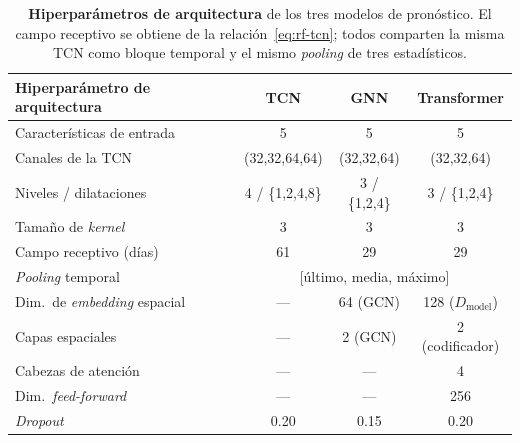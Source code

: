 \begin{table}[ht!]
  \centering
  \small
  \begin{tabular}{@{}lccc@{}}
    \toprule
    \textbf{Hiperparámetro de arquitectura} & \textbf{TCN}                                & \textbf{GNN}  & \textbf{Transformer}     \\
    \midrule
    Características de entrada              & 5                                           & 5             & 5                        \\
    Canales de la TCN                       & (32,32,64,64)                               & (32,32,64)    & (32,32,64)               \\
    Niveles / dilataciones                  & 4 / \{1,2,4,8\}                             & 3 / \{1,2,4\} & 3 / \{1,2,4\}            \\
    Tamaño de \textit{kernel}               & 3                                           & 3             & 3                        \\
    Campo receptivo (días)                  & 61                                          & 29            & 29                       \\
    \textit{Pooling} temporal               & \multicolumn{3}{c}{[último, media, máximo]}                                            \\
    Dim.\ de \textit{embedding} espacial    & ---                                         & 64 (GCN)      & 128 ($D_{\text{model}}$) \\
    Capas espaciales                        & ---                                         & 2 (GCN)       & 2 (codificador)          \\
    Cabezas de atención                     & ---                                         & ---           & 4                        \\
    Dim.\ \textit{feed-forward}             & ---                                         & ---           & 256                      \\
    \textit{Dropout}                        & 0.20                                        & 0.15          & 0.20                     \\
    \bottomrule
  \end{tabular}
  \caption[Hiperparámetros de arquitectura de los modelos de pronóstico]{\textbf{Hiperparámetros de arquitectura} de los tres modelos de pronóstico. El campo receptivo se obtiene de la relación~\eqref{eq:rf-tcn}; todos comparten la misma TCN como bloque temporal y el mismo \textit{pooling} de tres estadísticos.}
  \label{tab:hiper-arq}
\end{table}


